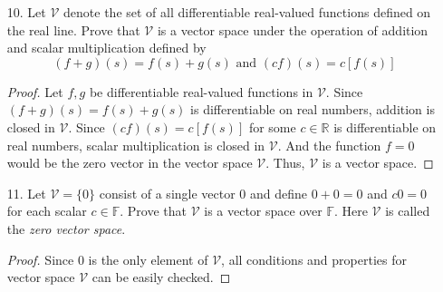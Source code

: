 \documentclass{article}
\theoremstyle{claim}
\theoremstyle{definition}
\begin{document}
\begin{enumerate}
\begin{enumerate}
\begin{enumerate}
                    \begin{proof}
                        Pretty much the same approach as the previous corollary.
                    \end{proof}
                \end{enumerate}
            \item[10.] Let $\mathcal{V}$ denote the set of all differentiable real-valued functions defined on the real line. Prove that $\mathcal{V}$ is a vector space under the operation of addition and scalar multiplication defined by
                \begin{equation*}
                    (f + g)(s) = f(s) + g(s) \text{ and } (cf)(s) = c[f(s)]
                \end{equation*}
                \begin{proof}
                    Let $f, g$ be differentiable real-valued functions in $\mathcal{V}$. Since $(f + g)(s) = f(s) + g(s)$ is differentiable on real numbers, addition is closed in $\mathcal{V}$. Since $(cf)(s) = c[f(s)]$ for some $c \in \mathbb{R}$ is differentiable on real numbers, scalar multiplication is closed in $\mathcal{V}$. And the function $f = 0$ would be the zero vector in the vector space $\mathcal{V}$. Thus, $\mathcal{V}$ is a vector space.
                \end{proof}
            \item[11.] Let $\mathcal{V} = \{0\}$ consist of a single vector $0$ and define $0 + 0 = 0$ and $c0 = 0$ for each scalar $c \in \mathbb{F}$. Prove that $\mathcal{V}$ is a vector space over $\mathbb{F}$. Here $\mathcal{V}$ is called the \emph{zero vector space}.
            \begin{proof}
                Since $0$ is the only element of $\mathcal{V}$, all conditions and properties for vector space $\mathcal{V}$ can be easily checked.
            \end{proof}

        
        \end{enumerate}
\end{enumerate}
\end{document}
